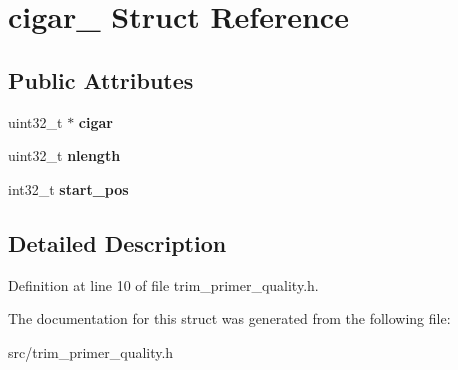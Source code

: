 \hypertarget{structcigar__}{}\section{cigar\+\_\+ Struct Reference}
\label{structcigar__}
\subsection*{Public Attributes}
\begin{DoxyCompactItemize}
\item 
\mbox{\label{structcigar___a2c1930b861900fc79213a615c84fc2fb}} 
uint32\+\_\+t $\ast$ {\bfseries cigar}
\item 
\mbox{\label{structcigar___a45a3bbf4787f09a712a05b657d516ba3}} 
uint32\+\_\+t {\bfseries nlength}
\item 
\mbox{\label{structcigar___ac23b36981c2b3334921345222ff8a19e}} 
int32\+\_\+t {\bfseries start\+\_\+pos}
\end{DoxyCompactItemize}


\subsection{Detailed Description}


Definition at line 10 of file trim\+\_\+primer\+\_\+quality.\+h.



The documentation for this struct was generated from the following file\+:\begin{DoxyCompactItemize}
\item 
src/trim\+\_\+primer\+\_\+quality.\+h\end{DoxyCompactItemize}

